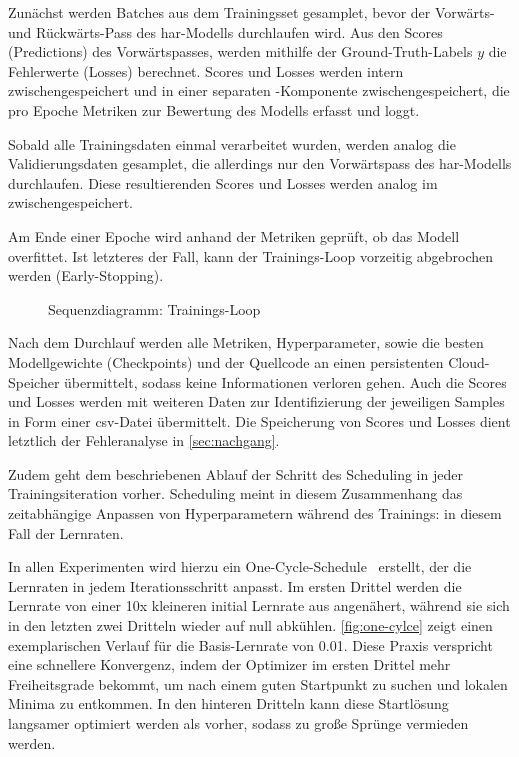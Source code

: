 Zunächst werden Batches aus dem Trainingsset gesamplet, bevor der Vorwärts- und Rückwärts-Pass des \gls{har}-Modells durchlaufen wird.
Aus den Scores (Predictions) des Vorwärtspasses, werden mithilfe der Ground-Truth-Labels $y$ die Fehlerwerte (Losses) berechnet.
Scores und Losses werden intern zwischengespeichert und in einer separaten -Komponente zwischengespeichert, die pro Epoche Metriken zur Bewertung des Modells erfasst und loggt.

Sobald alle Trainingsdaten einmal verarbeitet wurden, werden analog die Validierungsdaten gesamplet, die allerdings nur den Vorwärtspass des \gls{har}-Modells durchlaufen.
Diese resultierenden Scores und Losses werden analog im  zwischengespeichert.

Am Ende einer Epoche wird anhand der Metriken geprüft, ob das Modell overfittet.
Ist letzteres der Fall, kann der Trainings-Loop vorzeitig abgebrochen werden (Early-Stopping).

\begin{figure}[htbp!]
    \centering
    \caption{Sequenzdiagramm: Trainings-Loop}
    \label{fig:train-loop}
\end{figure}

Nach dem Durchlauf werden alle Metriken, Hyperparameter, sowie die besten Modellgewichte (Checkpoints) und der Quellcode an einen persistenten Cloud-Speicher übermittelt, sodass keine Informationen verloren gehen.
Auch die Scores und Losses werden mit weiteren Daten zur Identifizierung der jeweiligen Samples in Form einer \gls{csv}-Datei übermittelt.
Die Speicherung von Scores und Losses dient letztlich der Fehleranalyse in \autoref{sec:nachgang}.

Zudem geht dem beschriebenen Ablauf der Schritt des Scheduling in jeder Trainingsiteration vorher.
Scheduling meint in diesem Zusammenhang das zeitabhängige Anpassen von Hyperparametern während des Trainings: in diesem Fall der Lernraten.

In allen Experimenten wird hierzu ein One-Cycle-Schedule~\cite{Smith15} erstellt, der die Lernraten in jedem Iterationsschritt anpasst.
Im ersten Drittel werden die Lernrate von einer 10x kleineren initial Lernrate aus angenähert, während sie sich in den letzten zwei Dritteln wieder auf null abkühlen.
\autoref{fig:one-cylce} zeigt einen exemplarischen Verlauf für die Basis-Lernrate von 0.01.
Diese Praxis verspricht eine schnellere Konvergenz, indem der Optimizer im ersten Drittel mehr Freiheitsgrade bekommt, um nach einem guten Startpunkt zu suchen und lokalen Minima zu entkommen.
In den hinteren Dritteln kann diese Startlösung langsamer optimiert werden als vorher, sodass zu große Sprünge vermieden werden.

